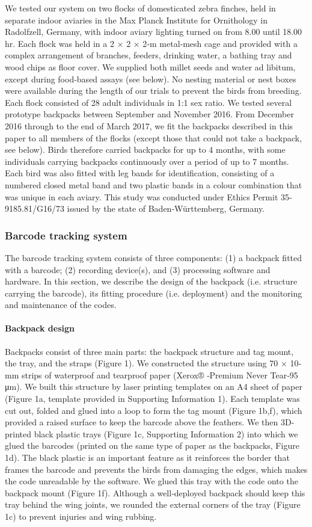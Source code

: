 \documentclass[11pt,a4paper,oneside]{article}
\begin{document}
We tested our system on two flocks of domesticated zebra finches, held in separate indoor aviaries in the Max Planck Institute for Ornithology in Radolfzell, Germany, with indoor aviary lighting turned on from 8.00 until 18.00 hr. Each flock was held in a 2 × 2 × 2‐m metal‐mesh cage and provided with a complex arrangement of branches, feeders, drinking water, a bathing tray and wood chips as floor cover. We supplied both millet seeds and water ad libitum, except during food‐based assays (see below). No nesting material or nest boxes were available during the length of our trials to prevent the birds from breeding. Each flock consisted of 28 adult individuals in 1:1 sex ratio. We tested several prototype backpacks between September and November 2016. From December 2016 through to the end of March 2017, we fit the backpacks described in this paper to all members of the flocks (except those that could not take a backpack, see below). Birds therefore carried backpacks for up to 4 months, with some individuals carrying backpacks continuously over a period of up to 7 months. Each bird was also fitted with leg bands for identification, consisting of a numbered closed metal band and two plastic bands in a colour combination that was unique in each aviary. This study was conducted under Ethics Permit 35‐9185.81/G16/73 issued by the state of Baden‐Württemberg, Germany.

\subsubsection{Barcode tracking system}
The barcode tracking system consists of three components: (1) a backpack fitted with a barcode; (2) recording device(s), and (3) processing software and hardware. In this section, we describe the design of the backpack (i.e. structure carrying the barcode), its fitting procedure (i.e. deployment) and the monitoring and maintenance of the codes.

\paragraph{Backpack design}
Backpacks consist of three main parts: the backpack structure and tag mount, the tray, and the straps (Figure 1). We constructed the structure using 70 × 10‐mm strips of waterproof and tearproof paper (Xerox® ‐Premium Never Tear‐95 μm). We built this structure by laser printing templates on an A4 sheet of paper (Figure 1a, template provided in Supporting Information 1). Each template was cut out, folded and glued into a loop to form the tag mount (Figure 1b,f), which provided a raised surface to keep the barcode above the feathers. We then 3D‐printed black plastic trays (Figure 1c, Supporting Information 2) into which we glued the barcodes (printed on the same type of paper as the backpacks, Figure 1d). The black plastic is an important feature as it reinforces the border that frames the barcode and prevents the birds from damaging the edges, which makes the code unreadable by the software. We glued this tray with the code onto the backpack mount (Figure 1f). Although a well‐deployed backpack should keep this tray behind the wing joints, we rounded the external corners of the tray (Figure 1c) to prevent injuries and wing rubbing.
\end{document}
